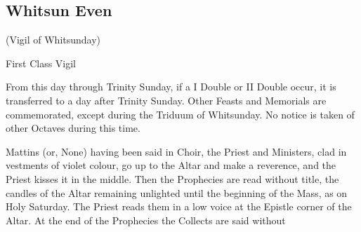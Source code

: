 \subsection{Whitsun Even}

\centerline{\small{(Vigil of Whitsunday)}}

\begin{inhead}
	First Class Vigil
\end{inhead}


\begin{rubric}
	From this day through Trinity Sunday, if a I Double or II Double occur, it is transferred to a day after Trinity Sunday. Other Feasts and Memorials are commemorated, except during the Triduum of Whitsunday. No notice is taken of other Octaves during this time.
\end{rubric}

\begin{rubric}
	Mattins (or, None) having been said in Choir, the Priest and Ministers, clad in vestments of violet colour, go up to the Altar and make a reverence, and the Priest kisses it in the middle. Then the Prophecies are read without title, the candles of the Altar remaining unlighted until the beginning of the Mass, as on Holy Saturday. The Priest reads them in a low voice at the Epistle corner of the Altar. At the end of the Prophecies the Collects are said without 
\end{rubric}

